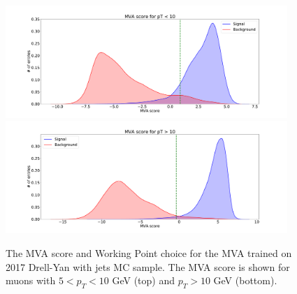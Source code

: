 \begin{figure}[!htb]
   \vspace*{0.3cm}
   \begin{center}
      \includegraphics[width=0.95\textwidth]{Figures/Muons/MVA_score_5_2017.pdf}\\
      \includegraphics[width=0.95\textwidth]{Figures/Muons/MVA_score_10_2017.pdf}
   \caption{The MVA score and Working Point choice for the MVA trained on 2017 Drell-Yan with jets MC sample. The MVA score is shown for muons with
   $5 < p_T < 10 $ GeV (top) and $p_T > 10$ GeV (bottom).}
   \label{fig:mu_MVA_score_2017}
   \end{center}
\end{figure}

